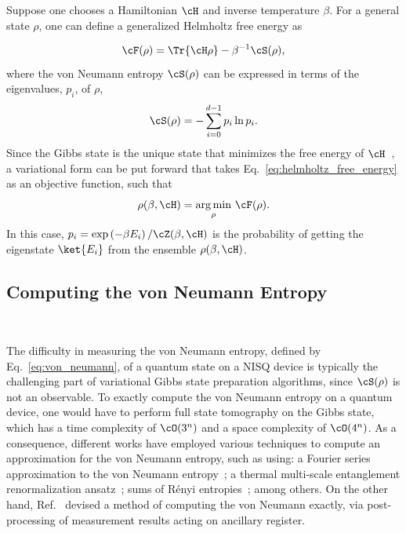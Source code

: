 Suppose one chooses a Hamiltonian $\cH$ and inverse temperature
$\beta$. For a general state $\rho$, one can define a generalized
Helmholtz free energy as


\begin{equation}
    \cF(\rho) = \Tr{\cH \rho} - \beta^{-1}\cS(\rho),
    \label{eq:helmholtz_free_energy}
\end{equation}
where the von Neumann entropy $\cS(\rho)$ can be expressed in terms of the eigenvalues, $p_i$, of $\rho$,
\begin{equation}
    \cS(\rho) = -\sum_{i=0}^{d - 1} p_i \ln p_i.
    \label{eq:von_neumann}
\end{equation}
Since the Gibbs state is the unique state that minimizes the free energy of $\cH$~\cite{Matsui1994}, a variational form can be put forward that takes Eq.~\eqref{eq:helmholtz_free_energy} as an objective function, such that
\begin{equation}
    \rho(\beta, \cH) = \underset{\rho}{\arg\min}~\cF(\rho).
\end{equation}
In this case, $p_i = \exp\left(-\beta E_i\right)/\cZ(\beta, \cH)$ is the probability of getting the eigenstate $\ket{E_i}$ from the ensemble $\rho(\beta, \cH)$.

\subsection{Computing the von Neumann Entropy}~\label{sec:vn_entropy}

The difficulty in measuring the von Neumann entropy, defined by
Eq.~\eqref{eq:von_neumann}, of a quantum state on a \ac{NISQ} device
is typically the challenging part of variational Gibbs state
preparation algorithms, since $\cS(\rho)$ is not an observable. To
exactly compute the von Neumann entropy on a quantum device, one would
have to perform full state tomography on the Gibbs state, which has a
time complexity of $\cO(3^n)$ and a space complexity of $\cO(4^n)$. As
a consequence, different works have employed various techniques to
compute an approximation for the von Neumann entropy, such as using: a
Fourier series approximation to the von Neumann
entropy~\cite{Chowdhury2020}; a thermal multi-scale entanglement
renormalization ansatz~\cite{Sewell2022}; sums of R\'enyi
entropies~\cite{Foldager2022}; among others. On the other hand,
Ref.~\cite{Consiglio2023} devised a method of computing the von
Neumann exactly, via post-processing of measurement results acting on
ancillary register.

